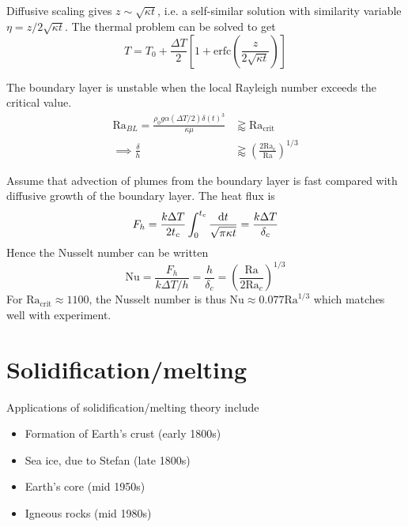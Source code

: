 \documentclass{jknotes}
\newcommand{\Ra}{\text{Ra}}
\begin{document}
Diffusive scaling gives $z \sim \sqrt{\kappa t}$, i.e. a self-similar solution
with similarity variable $\eta = z/2\sqrt{\kappa t}$. The thermal problem can
be solved to get
\begin{equation}
	T = T_0 + \frac{\Delta T}{2}\left[ 1 + \text{erfc}(\frac{z}{2\sqrt{\kappa
	t}})\right]
\end{equation}

The boundary layer is unstable when the local Rayleigh number exceeds the
critical value.
\begin{align}
	\Ra_{BL} = \frac{\rho_0 g \alpha (\Delta T/2) \delta(t)^3}{\kappa \mu}
	&\gtrapprox \Ra_{\text{crit}} \\
	\implies \frac{\delta}{h} &\gtrapprox \left( \frac{2
	\Ra_c}{\Ra}\right)^{1/3}
\end{align}

Assume that advection of plumes from the boundary layer is fast compared with
diffusive growth of the boundary layer. The heat flux is
\begin{equation}
	F_h = \frac{k \Delta T}{2t_c} \int_0^{t_c} \frac{\diffd t}{\sqrt{\pi\kappa
	t}} = \frac{k\Delta T}{\delta_c}
\end{equation}
Hence the Nusselt number can be written
\begin{equation}
	\text{Nu} = \frac{F_h}{k\Delta T/h} = \frac{h}{\delta_c} = \left(
	\frac{\Ra}{2\Ra_c}\right)^{1/3}
\end{equation}
For $\Ra_{\text{crit}} \approx 1100$, the Nusselt number is thus $\text{Nu}
\approx 0.077 \Ra^{1/3}$ which matches well with experiment.

\section{Solidification/melting}
Applications of solidification/melting theory include
\begin{itemize}
	\item Formation of Earth's crust (early 1800s)
	\item Sea ice, due to Stefan (late 1800s)
	\item Earth's core (mid 1950s)
	\item Igneous rocks (mid 1980s)
\end{itemize}
\end{document}
